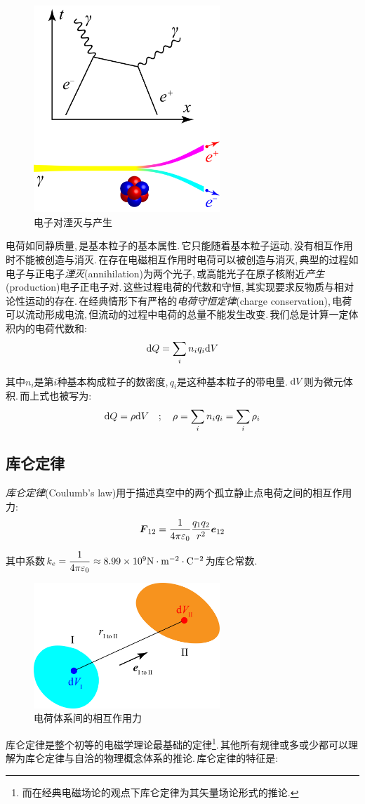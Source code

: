 \begin{figure}
\centering
\includegraphics[width=7cm]{image/7-1-1.png}
\caption{电子对湮灭与产生}
\end{figure}
电荷如同静质量,\,是基本粒子的基本属性.\,它只能随着基本粒子运动,\,没有相互作用时不能被创造与消灭.\,在存在电磁相互作用时电荷可以被创造与消灭,\,典型的过程如电子与正电子\emph{湮灭}(annihilation)为两个光子,\,或高能光子在原子核附近\emph{产生}(production)电子正电子对.\,这些过程电荷的代数和守恒,\,其实现要求反物质与相对论性运动的存在.\,在经典情形下有严格的\emph{电荷守恒定律}(charge conservation),\,电荷可以流动形成电流,\,但流动的过程中电荷的总量不能发生改变.\,我们总是计算一定体积内的电荷代数和:
\[\textrm{d} Q=\sum_i{n_i q_i}\textrm{d} V\]

其中\(n_i\)是第\(i\)种基本构成粒子的数密度,\,\(q_i\)是这种基本粒子的带电量.\,\(\textrm{d} V\)则为微元体积.\,而上式也被写为:
\[\textrm{d} Q=\rho \textrm{d} V\quad;\quad \rho=\sum_i{n_i q_i}=\sum_i \rho_i\]

\subsection{库仑定律}
\emph{库仑定律}(Coulumb's law)用于描述真空中的两个孤立静止点电荷之间的相互作用力:
\[\boldsymbol{F}_{12}=\frac{1}{4\pi\varepsilon_0}\frac{q_1q_2}{r^2}\boldsymbol{e}_{12}\]

其中系数\(k_e=\dfrac{1}{4\pi \varepsilon_0}\approx 8.99\times 10^{9}{\rm N\cdot m^{-2} \cdot C^{-2}}\)为库仑常数.

\begin{figure}
\centering
\includegraphics[width=7cm]{image/7-1-2.png}
\caption{电荷体系间的相互作用力}
\end{figure}
库仑定律是整个初等的电磁学理论最基础的定律\footnote{而在经典电磁场论的观点下库仑定律为其矢量场论形式的推论.}.\,其他所有规律或多或少都可以理解为库仑定律与自洽的物理概念体系的推论.\,库仑定律的特征是:

